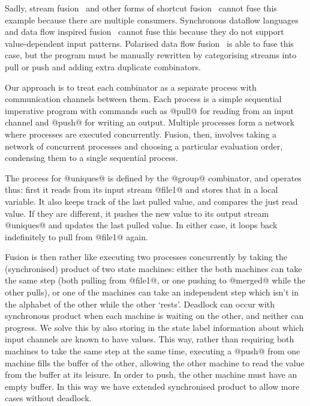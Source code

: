 Sadly, stream fusion~\cite{coutts2007stream} and other forms of shortcut fusion~\cite{jones2001playing} cannot fuse this example because there are multiple consumers.
Synchronous dataflow languages~\cite{mandel2010lucy} and data flow inspired fusion~\cite{lippmeier2013data} cannot fuse this because they do not support value-dependent input patterns.
Polarised data flow fusion~\cite{lippmeier2016polarized} is able to fuse this case, but the program must be manually rewritten by categorising streams into pull or push and adding extra duplicate combinators.

Our approach is to treat each combinator as a separate process with communication channels between them.
Each process is a simple sequential imperative program with commands such as @pull@ for reading from an input channel and @push@ for writing an output.
Multiple processes form a network where processes are executed concurrently.
Fusion, then, involves taking a network of concurrent processes and choosing a particular evaluation order, condensing them to a single sequential process.

The process for @uniques@ is defined by the @group@ combinator, and operates thus: first it reads from its input stream @file1@ and stores that in a local variable.
It also keeps track of the last pulled value, and compares the just read value.
If they are different, it pushes the new value to its output stream @uniques@ and updates the last pulled value.
In either case, it loops back indefinitely to pull from @file1@ again.

Fusion is then rather like executing two processes concurrently by taking the (synchronised) product of two state machines: either the both machines can take the same step (both pulling from @file1@, or one pushing to @merged@ while the other pulls), or one of the machines can take an independent step which isn't in the alphabet of the other while the other `rests'.
Deadlock can occur with synchronous product when each machine is waiting on the other, and neither can progress.
We solve this by also storing in the state label information about which input channels are known to have values.
This way, rather than requiring both machines to take the same step at the same time, executing a @push@ from one machine fills the buffer of the other, allowing the other machine to read the value from the buffer at its leisure.
In order to push, the other machine must have an empty buffer.
In this way we have extended synchronised product to allow more cases without deadlock.


